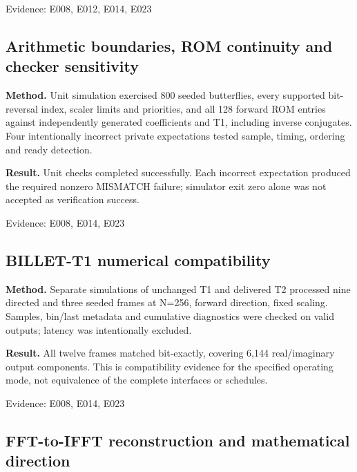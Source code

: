 \documentclass[11pt,a4paper]{article}
\begin{document}
{\small Evidence: E008,\allowbreak{} E012,\allowbreak{} E014,\allowbreak{} E023}

\subsection{Arithmetic boundaries,\allowbreak{} ROM continuity and checker sensitivity}

\textbf{Method.} Unit simulation exercised 800 seeded butterflies,\allowbreak{} every supported bit-reversal index,\allowbreak{} scaler limits and priorities,\allowbreak{} and all 128 forward ROM entries against independently generated coefficients and T1,\allowbreak{} including inverse conjugates. Four intentionally incorrect private expectations tested sample,\allowbreak{} timing,\allowbreak{} ordering and ready detection.

\textbf{Result.} Unit checks completed successfully. Each incorrect expectation produced the required nonzero MISMATCH failure; simulator exit zero alone was not accepted as verification success.

{\small Evidence: E008,\allowbreak{} E014,\allowbreak{} E023}

\subsection{BILLET-T1 numerical compatibility}

\textbf{Method.} Separate simulations of unchanged T1 and delivered T2 processed nine directed and three seeded frames at N=\allowbreak{}256,\allowbreak{} forward direction,\allowbreak{} fixed scaling. Samples,\allowbreak{} bin/\allowbreak{}last metadata and cumulative diagnostics were checked on valid outputs; latency was intentionally excluded.

\textbf{Result.} All twelve frames matched bit-exactly,\allowbreak{} covering 6,\allowbreak{}144 real/\allowbreak{}imaginary output components. This is compatibility evidence for the specified operating mode,\allowbreak{} not equivalence of the complete interfaces or schedules.

{\small Evidence: E008,\allowbreak{} E014,\allowbreak{} E023}

\subsection{FFT-to-IFFT reconstruction and mathematical direction}
\end{document}
